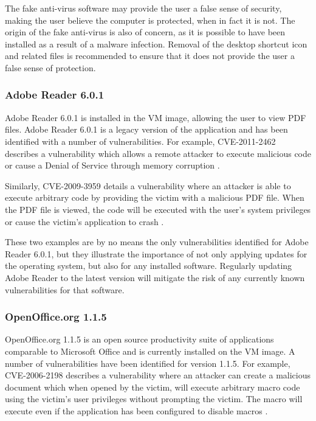 The fake anti-virus software may provide the user a false sense of security, making the user believe the computer is protected, when in fact it is not. The origin of the fake anti-virus is also of concern, as it is possible to have been installed as a result of a malware infection. Removal of the desktop shortcut icon and related files is recommended to ensure that it does not provide the user a false sense of protection.

\subsubsection{Adobe Reader 6.0.1}

Adobe Reader 6.0.1 is installed in the VM image, allowing the user to view PDF files. Adobe Reader 6.0.1 is a legacy version of the application and has been identified with a number of vulnerabilities. For example, CVE-2011-2462 describes a vulnerability which allows a remote attacker to execute malicious code or cause a Denial of Service through memory corruption \citep{Adobe2011}.

Similarly, CVE-2009-3959 details a vulnerability where an attacker is able to execute arbitrary code by providing the victim with a malicious PDF file. When the PDF file is viewed, the code will be executed with the user's system privileges or cause the victim's application to crash \citep{SecurityFocus2010, SecurityTracker2010}.

These two examples are by no means the only vulnerabilities identified for Adobe Reader 6.0.1, but they illustrate the importance of not only applying updates for the operating system, but also for any installed software. Regularly updating Adobe Reader to the latest version will mitigate the risk of any currently known vulnerabilities for that software.

\subsubsection{OpenOffice.org 1.1.5}

OpenOffice.org 1.1.5 is an open source productivity suite of applications comparable to Microsoft Office and is currently installed on the VM image. A number of vulnerabilities have been identified for version 1.1.5. For example, CVE-2006-2198 describes a vulnerability where an attacker can create a malicious document which when opened by the victim, will execute arbitrary macro code using the victim's user privileges without prompting the victim. The macro will execute even if the application has been configured to disable macros \citep{MITRE2006a}.

